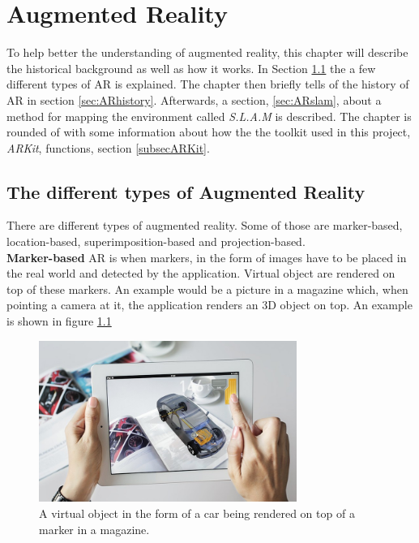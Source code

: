 \chapter{Augmented Reality}

To help better the understanding of augmented reality, this chapter will describe the historical background as well as how it works. In Section \ref{sec:ARtype} the a few different types of AR is explained. The chapter then briefly tells of the history of AR in section \ref{sec:ARhistory}. Afterwards, a section, \ref{sec:ARslam}, about a method for mapping the environment called \textit{S.L.A.M} is described. The chapter is rounded of with some information about how the the toolkit used in this project, \textit{ARKit}, functions, section \ref{subsecARKit}. 

\section{The different types of Augmented Reality}
\label{sec:ARtype}
There are different types of augmented reality. Some of those are marker-based, location-based, superimposition-based and projection-based. \\

\textbf{Marker-based} AR is when markers, in the form of images have to be placed in the real world and detected by the application. Virtual object are rendered on top of these markers. An example would be a picture in a magazine which, when pointing a camera at it, the application renders an 3D object on top. An example is shown in figure \ref{fig:marker-based-ar} \\

\begin{figure}[hbtp]
\begin{center}
\includegraphics[width = 0.75\textwidth]{./Images/markerbasedar.jpg} 
\caption{A virtual object in the form of a car being rendered on top of a marker in a magazine.}
\label{fig:marker-based-ar}
\end{center}
\end{figure}

